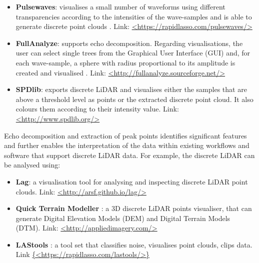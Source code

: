 \documentclass{subfiles}
\begin{document}
	\begin{itemize}
		\item \textbf{Pulsewaves}: visualises a small number of waveforms using different transparencies according to the intensities of the wave-samples and is able to generate discrete point clouds \cite{Isenburg2012Pulsewaves}. \newline Link: \url{<https://rapidlasso.com/pulsewaves/>}
	    \item \textbf{FullAnalyze}: supports echo decomposition. Regarding visualisations, the user can select single trees from the Graphical User Interface (GUI) and, for each wave-sample, a sphere with radius proportional to its amplitude is created and visualised \cite{Chauve2009}. \newline Link: \url{<http://fullanalyze.sourceforge.net/>} 
    	\item \textbf{SPDlib}: exports discrete LiDAR and visualises either the samples that are above a threshold level as points or the extracted discrete point cloud. It also colours them according to their intensity value\cite{Bunting2013}. \newline Link: \url{<http://www.spdlib.org/>} 
	\end{itemize}

	\par Echo decomposition and extraction of peak points identifies significant features and further enables the interpretation of the data within existing workflows and software that support discrete LiDAR data. For example, the discrete LiDAR can be analysed using: 
	
	\begin{itemize}
	\item \textbf{Lag}: a visualisation tool for analysing and inspecting discrete LiDAR point clouds. \newline Link: \url{<http://arsf.github.io/lag/>}
	
	\item \textbf{Quick Terrain Modeller} : a 3D discrete LiDAR points visualiser, that can generate Digital Elevation Models (DEM) and Digital Terrain Models (DTM). \newline Link: \url{<http://appliedimagery.com/>}
	
	\item \textbf{LAStools} : a tool set that classifies noise, visualises point clouds, clips data.  \newline Link \url{{<https://rapidlasso.com/lastools/>}}
	\end{itemize}
		
\end{document}
